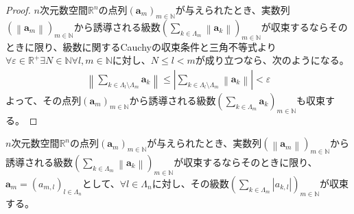 \documentclass[dvipdfmx]{jsarticle}
\begin{document}
\begin{proof}
$n$次元数空間$\mathbb{R}^{n}$の点列$\left( \mathbf{a}_{m} \right)_{m \in \mathbb{N}}$が与えられたとき、実数列$\left( \left\| \mathbf{a}_{m} \right\| \right)_{m \in \mathbb{N}}$から誘導される級数$\left( \sum_{k \in \varLambda_{m}} \left\| \mathbf{a}_{k} \right\| \right)_{m \in \mathbb{N}}$が収束するならそのときに限り、級数に関するCauchyの収束条件と三角不等式より$\forall\varepsilon \in \mathbb{R}^{+}\exists N \in \mathbb{N}\forall l,m \in \mathbb{N}$に対し、$N \leq l < m$が成り立つなら、次のようになる。
\begin{align*}
\left\| \sum_{k \in \varLambda_{l} \setminus \varLambda_{m}} \mathbf{a}_{k} \right\| \leq \left| \sum_{k \in \varLambda_{l} \setminus \varLambda_{m}} \left\| \mathbf{a}_{k} \right\| \right| < \varepsilon
\end{align*}
よって、その点列$\left( \mathbf{a}_{m} \right)_{m \in \mathbb{N}}$から誘導される級数$\left( \sum_{k \in \varLambda_{m}} \mathbf{a}_{k} \right)_{m \in \mathbb{N}}$も収束する。
\end{proof}
\begin{thm}\label{4.1.8.14}
$n$次元数空間$\mathbb{R}^{n}$の点列$\left( \mathbf{a}_{m} \right)_{m \in \mathbb{N}}$が与えられたとき、実数列$\left( \left\| \mathbf{a}_{m} \right\| \right)_{m \in \mathbb{N}}$から誘導される級数$\left( \sum_{k \in \varLambda_{m}} \left\| \mathbf{a}_{k} \right\| \right)_{m \in \mathbb{N}}$が収束するならそのときに限り、$\mathbf{a}_{m} = \left( a_{m,l} \right)_{l \in \varLambda_{n}}$として、$\forall l \in \varLambda_{n}$に対し、その級数$\left( \sum_{k \in \varLambda_{m}} \left| a_{k,l} \right| \right)_{m \in \mathbb{N}}$が収束する。
\end{thm}
\end{document}
